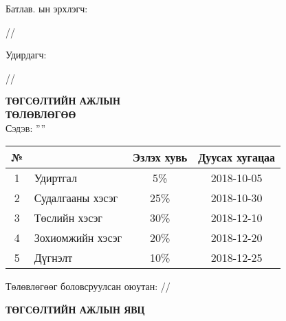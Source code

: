 
\begin{titlepage}

\vspace*{0.5cm}
Батлав. \deptname ын эрхлэгч: 
\begin{flushright}
\makebox[4cm]{\dotfill} /\chairname/ 
\end{flushright}

Удирдагч: 
\begin{flushright}
\makebox[4cm]{\dotfill} /\supname/
\end{flushright}

\begin{center}

\vspace*{2cm}
\textbf{{\large ТӨГСӨЛТИЙН АЖЛЫН \\ ТӨЛӨВЛӨГӨӨ}}\\[0.5cm]

\textsc{\large Сэдэв: ''\ttitle''}\\[0.5cm]

\begin{tabular}{|c|p{7cm}|c|c|}
	\hline
	№ & \makebox[7cm][c]{Ажлын бүлэг, хэсгийн нэр} & Эзлэх хувь & Дуусах хугацаа \\ \hline
	1 & {Удиртгал}         &  5\% & 2018-10-05 \\ \hline
	2 & {Судалгааны хэсэг} & 25\% & 2018-10-30 \\ \hline
	3 & {Төслийн хэсэг}    & 30\% & 2018-12-10 \\ \hline
	4 & {Зохиомжийн хэсэг} & 20\% & 2018-12-20 \\ \hline
	5 & {Дүгнэлт}          & 10\% & 2018-12-25 \\ \hline
\end{tabular}

\vspace{2cm}
Төлөвлөгөөг боловсруулсан оюутан: \makebox[3cm]{\dotfill} /\shortname/

\end{center}

\newpage

\begin{center}

\vspace*{2cm}
\textbf{{\large ТӨГСӨЛТИЙН АЖЛЫН ЯВЦ}}\\[0.5cm]


\end{center}
\end{titlepage}
